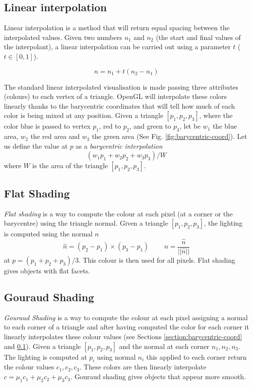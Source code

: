\subsection{Linear interpolation}\label{section:linear-interpolation}
Linear interpolation is a method that will return equal spacing between the interpolated values. Given two numbers $n_1$ and $n_2$ (the start and final values of the interpolant), a linear interpolation can be carried out using a parameter $t$ ($t \in [0,1]$). \cite{WEBSITE:interpolation}

$$ n = n_1 + t (n_2 - n_1)$$


The standard linear interpolated visualisation is made passing three attributes (colours) to each vertex of a triangle. OpenGL will interpolate these colors linearly thanks to the barycentric coordinates that will tell how much of each color is being mixed at any position.
Given a triangle $[p_1, p_2, p_3]$, where the color blue is passed to vertex $p_1$, red to $p_2$, and green to $p_3$, let be $w_1$ the blue area, $w_2$ the red area and $w_3$ the green area (See Fig. \ref{fig:barycentric-coord}). Let us define the value at $p$ as a \textit{barycentric interpolation} $$(w_1p_1 + w_2p_2 + w_3p_3)/W$$ where $W$ is the area of the triangle $[p_1, p_2, p_3]$.


\subsection{Flat Shading}
\textit{Flat shading} is a way to compute the colour at each pixel (at a corner or the barycentre) using the triangle normal.
Given a triangle $[p_1, p_2, p_3]$, the lighting is computed using the normal $n$ $$\widehat{n} = (p_2 - p_1) \times (p_3 - p_1) \;\;\;\;\;\;\;\; n = \frac{ \widehat{n} } { ||\widehat{n}|| } $$ at $p= (p_1 + p_2 + p_3)/3$. This colour is then used for all pixels. Flat shading gives objects with flat facets.
\cite{SLIDE:ICORSI}

\subsection{Gouraud Shading}
\textit{Gouraud Shading} is a way to compute the colour at each pixel assigning a normal to each corner of a triangle and after having computed the color for each corner it linearly interpolates these colour values (see Sections \ref{section:barycentric-coord} and \ref{section:linear-interpolation}).
Given a triangle $[p_1, p_2, p_3]$ and the normal at each corner $n_1, n_2, n_3$.
The lighting is computed at $p_i$ using normal $n_i$ this applied to each corner return the colour values $c_1, c_2, c_3$.
These colors are then linearly interpolate $c = {\mu}_1 c_1 + {\mu}_2 c_2 + {\mu}_3 c_3$. Gouraud shading gives objects that appear more smooth. \cite{SLIDE:ICORSI}



